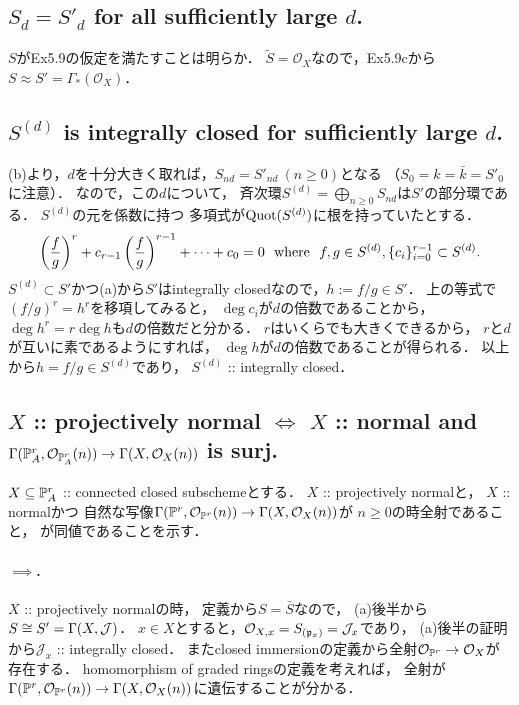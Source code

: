 \documentclass[a4paper]{jsarticle}
\newcommand{\shJ}{\mathcal{J}}
\newcommand{\shO}{\mathcal{O}}
\begin{document}
    \subsection{$S_d=S'_d$ for all sufficiently large $d$.}
    $S$がEx5.9の仮定を満たすことは明らか．
    $\tilde{S}=\shO_X$なので，Ex5.9cから$S \approx S'=\Gamma_*(\shO_X)$．

    \subsection{$S^{(d)}$ is integrally closed for sufficiently large $d$.}
    (b)より，$d$を十分大きく取れば，$S_{nd}=S'_{nd} ~(n \geq 0)$となる
    （$S_0=k=\bar{k}=S'_0$に注意）．
    なので，この$d$について，
    斉次環$S^{(d)}=\bigoplus_{n \geq 0} S_{nd}$は$S'$の部分環である．
    $S^{(d)}$の元を係数に持つ
    多項式が$\operatorname{Quot}(S^{(d)})$に根を持っていたとする．
    \[
        \left(\frac{f}{g}\right)^r+c_{r-1}\left(\frac{f}{g}\right)^{r-1}+\dots+c_0=0
        ~~\text{where}~~
        f,g \in S^{(d)}, \{c_i\}_{i=0}^{r-1} \subset S^{(d)}.
    \]
    $S^{(d)} \subset S'$かつ(a)から$S'$はintegrally closedなので，$h:=f/g \in S'$．
    上の等式で$(f/g)^r=h^r$を移項してみると，
    $\deg c_i$が$d$の倍数であることから，
    $\deg h^r=r \deg h$も$d$の倍数だと分かる．
    $r$はいくらでも大きくできるから，
    $r$と$d$が互いに素であるようにすれば，
    $\deg h$が$d$の倍数であることが得られる．
    以上から$h=f/g \in S^{(d)}$であり，
    $S^{(d)}$ :: integrally closed．

    \subsection{$X$ :: projectively normal $\iff$ $X$ :: normal and
        $\Gamma(\proj^r_A, \shO_{\proj^r_A}(n)) \to \Gamma(X,\shO_X(n))$ is surj.}

    $X \subseteq \mathbb{P}^r_A$ :: connected closed subschemeとする．
    $X$ :: projectively normalと，
    $X$ :: normalかつ
    自然な写像$\Gamma(\proj^r, \shO_{\proj^r}(n)) \to \Gamma(X,\shO_X(n))$が
    $n \geq 0$の時全射であること，
    が同値であることを示す．

    \paragraph{$\implies$.}
    $X$ :: projectively normalの時，
    定義から$S=\bar{S}$なので，
    (a)後半から$S \iso S'=\Gamma(X,\shJ)$．
    $x \in X$とすると，$\shO_{X,x}=S_{(\I{p}_x)}=\shJ_x$であり，
    (a)後半の証明から$\shJ_x$ :: integrally closed．
    またclosed immersionの定義から全射$\shO_{\proj^r} \to \shO_{X}$が存在する．
    homomorphism of graded ringsの定義を考えれば，
    全射が$\Gamma(\proj^r, \shO_{\proj^r}(n)) \to \Gamma(X,\shO_X(n))$に遺伝することが分かる．
\end{document}

